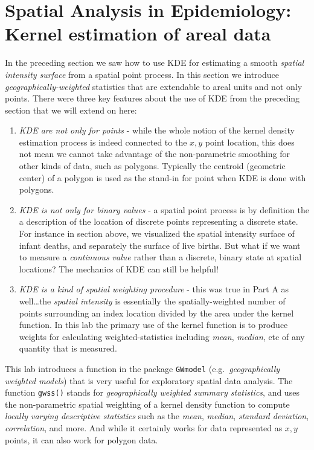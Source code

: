 \documentclass[
]{book}
\newcommand{\passthrough}[1]{#1}
\providecommand{\tightlist}{%
  \setlength{\itemsep}{0pt}\setlength{\parskip}{0pt}}
\begin{document}
\hypertarget{spatial-analysis-in-epidemiology-kernel-estimation-of-areal-data}{%
\section{Spatial Analysis in Epidemiology: Kernel estimation of areal data}\label{spatial-analysis-in-epidemiology-kernel-estimation-of-areal-data}}

In the preceding section we saw how to use KDE for estimating a smooth \emph{spatial intensity surface} from a spatial point process. In this section we introduce \emph{geographically-weighted} statistics that are extendable to areal units and not only points. There were three key features about the use of KDE from the preceding section that we will extend on here:

\begin{enumerate}
\def\labelenumi{\arabic{enumi}.}
\tightlist
\item
  \emph{KDE are not only for points} - while the whole notion of the kernel density estimation process is indeed connected to the \(x,y\) point location, this does not mean we cannot take advantage of the non-parametric smoothing for other kinds of data, such as polygons. Typically the centroid (geometric center) of a polygon is used as the stand-in for point when KDE is done with polygons.
\item
  \emph{KDE is not only for binary values} - a spatial point process is by definition the a description of the location of discrete points representing a discrete state. For instance in section above, we visualized the spatial intensity surface of infant deaths, and separately the surface of live births. But what if we want to measure a \emph{continuous value} rather than a discrete, binary state at spatial locations? The mechanics of KDE can still be helpful!
\item
  \emph{KDE is a kind of spatial weighting procedure} - this was true in Part A as well\ldots the \emph{spatial intensity} is essentially the spatially-weighted number of points surrounding an index location divided by the area under the kernel function. In this lab the primary use of the kernel function is to produce weights for calculating weighted-statistics including \emph{mean}, \emph{median}, etc of any quantity that is measured.
\end{enumerate}

This lab introduces a function in the package \passthrough{\lstinline!GWmodel!} (e.g.~\emph{geographically weighted models}) that is very useful for exploratory spatial data analysis. The function \passthrough{\lstinline!gwss()!} stands for \emph{geographically weighted summary statistics}, and uses the non-parametric spatial weighting of a kernel density function to compute \emph{locally varying descriptive statistics} such as the \emph{mean}, \emph{median}, \emph{standard deviation}, \emph{correlation}, and more. And while it certainly works for data represented as \(x,y\) points, it can also work for polygon data.
\end{document}
